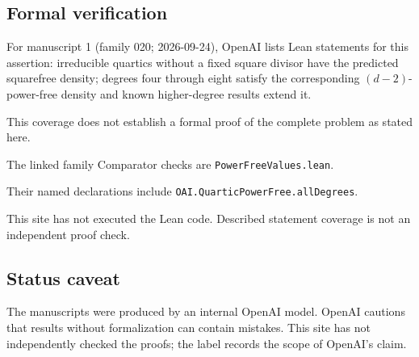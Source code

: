 \documentclass[11pt]{article}
\begin{document}
\subsection{Formal verification}
For manuscript 1 (family 020; 2026-09-24), OpenAI lists Lean statements for this assertion: irreducible quartics without a fixed square divisor have the predicted squarefree density; degrees four through eight satisfy the corresponding $(d-2)$-power-free density and known higher-degree results extend it.

This coverage does not establish a formal proof of the complete problem as stated here.

The linked family Comparator checks are \texttt{PowerFreeValues.lean}.

Their named declarations include \texttt{OAI.QuarticPowerFree.allDegrees}.

This site has not executed the Lean code. Described statement coverage is not an independent proof check.

\subsection{Status caveat}
The manuscripts were produced by an internal OpenAI model. OpenAI cautions that results without formalization can contain mistakes. This site has not independently checked the proofs; the label records the scope of OpenAI's claim.
\end{document}
